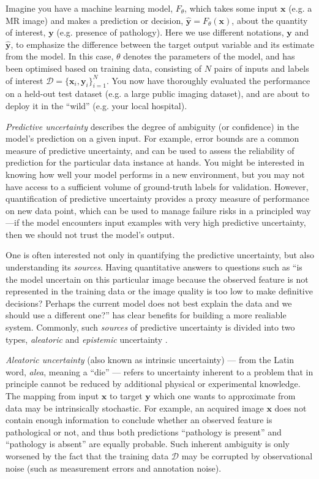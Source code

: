 Imagine you have a machine learning model, $F_{\theta}$, which takes some input $\mathbf{x}$  (e.g. a MR image) and makes a prediction or decision, $\hat{\mathbf{y}}=F_{\theta}(\mathbf{x})$, about the quantity of interest, $\mathbf{y}$ (e.g. presence of pathology). Here we use different notations, $\mathbf{y}$ and $\hat{\mathbf{y}}$, to emphasize the difference between the target output variable and its estimate from the model. In this case, $\theta$ denotes the parameters of the model, and has been optimised based on training data, consisting of $N$ pairs of inputs and labels of interest $\mathcal{D} = \{\mathbf{x}_{i}, \mathbf{y}_i\}_{i=1}^N $. You now have thoroughly evaluated the performance on a held-out test dataset (e.g. a large public imaging dataset), and are about to deploy it in the ``wild'' (e.g. your local hospital).

\textit{Predictive uncertainty} describes the degree of ambiguity (or confidence) in the model's prediction on a given input. For example, error bounds are a common measure of predictive uncertainty, and can be used to assess the reliability of prediction for the particular data instance at hands. You might be interested in knowing how well your model performs in a new environment, but you may not have access to a sufficient volume of ground-truth labels for validation. However, quantification of predictive uncertainty provides a proxy measure of performance on new data point, which can be used to manage failure risks in a principled way---if the model encounters input examples with very high predictive uncertainty, then we should not trust the model's output. 

One is often interested not only in quantifying the predictive uncertainty, but also understanding its \textit{sources}. Having quantitative answers to questions such as ``is the model uncertain on this particular image because the observed feature is not represented in the training data or the image quality is too low to make definitive decisions? Perhaps the current model does not best explain the data and we should use a different one?'' has clear benefits for building a more realiable system. Commonly, such \textit{sources} of predictive uncertainty is divided into two types, \textit{aleatoric} and \textit{epistemic} uncertainty \cite{hora1996aleatory,der2009aleatory}. 

\textit{Aleatoric uncertainty} (also known as intrinsic uncertainty) --- from the Latin word, \textit{alea}, meaning a ``die'' --- refers to uncertainty inherent to a problem that in principle cannot be reduced by additional physical or experimental knowledge. The mapping from input $\textbf{x}$ to target $\mathbf{y}$ which one wants to approximate from data may be intrinsically stochastic. For example, an acquired image $\textbf{x}$ does not contain enough information to conclude whether an observed feature is pathological or not, and thus both predictions ``pathology is present'' and ``pathology is absent'' are equally probable. Such inherent ambiguity is only worsened by the fact that the training data $\mathcal{D}$ may be corrupted by observational noise (such as measurement errors and annotation noise).  

